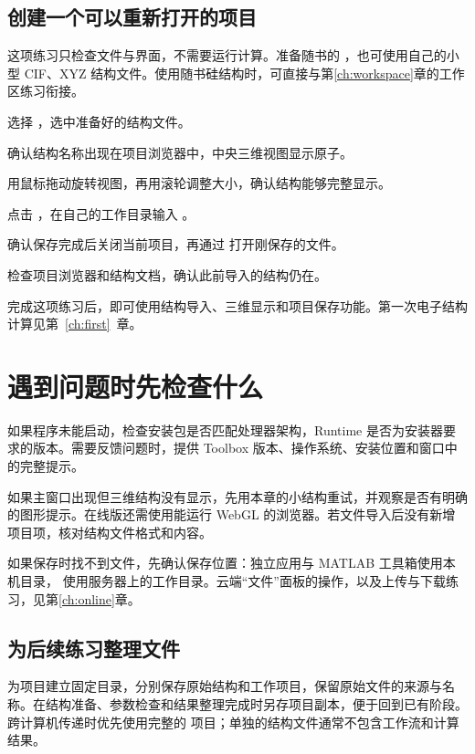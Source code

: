 \subsection{创建一个可以重新打开的项目}

这项练习只检查文件与界面，不需要运行计算。准备随书的 ，也可使用自己的小型 CIF、XYZ 结构文件。使用随书硅结构时，可直接与第\ref{ch:workspace}章的工作区练习衔接。

\begin{steps}
\item 选择 ，选中准备好的结构文件。
\item 确认结构名称出现在项目浏览器中，中央三维视图显示原子。
\item 用鼠标拖动旋转视图，再用滚轮调整大小，确认结构能够完整显示。
\item 点击 ，在自己的工作目录输入 。
\item 确认保存完成后关闭当前项目，再通过  打开刚保存的文件。
\item 检查项目浏览器和结构文档，确认此前导入的结构仍在。
\end{steps}


完成这项练习后，即可使用结构导入、三维显示和项目保存功能。第一次电子结构计算见第~\ref{ch:first}~章。

\section{遇到问题时先检查什么}

如果程序未能启动，检查安装包是否匹配处理器架构，Runtime 是否为安装器要求的版本。需要反馈问题时，提供 Toolbox 版本、操作系统、安装位置和窗口中的完整提示。

如果主窗口出现但三维结构没有显示，先用本章的小结构重试，并观察是否有明确的图形提示。在线版还需使用能运行 WebGL 的浏览器。若文件导入后没有新增项目项，核对结构文件格式和内容。

如果保存时找不到文件，先确认保存位置：独立应用与 MATLAB\regmark{} 工具箱使用本机目录，\ksonline{} 使用服务器上的工作目录。云端“文件”面板的操作，以及上传与下载练习，见第\ref{ch:online}章。

\subsection{为后续练习整理文件}

为项目建立固定目录，分别保存原始结构和工作项目，保留原始文件的来源与名称。在结构准备、参数检查和结果整理完成时另存项目副本，便于回到已有阶段。跨计算机传递时优先使用完整的  项目；单独的结构文件通常不包含工作流和计算结果。

